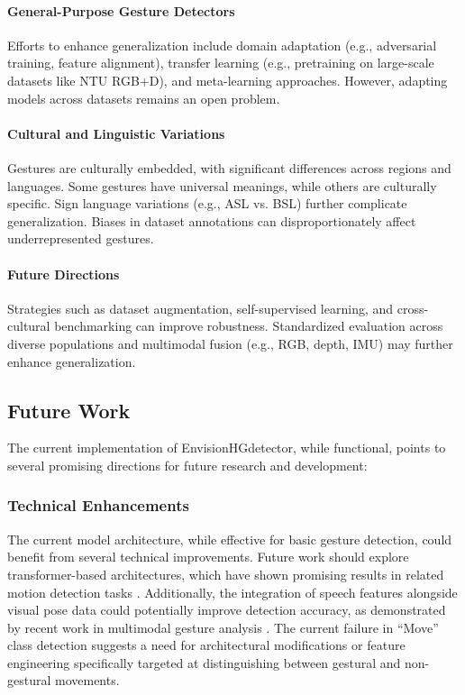 \paragraph{General-Purpose Gesture Detectors} Efforts to enhance generalization include domain adaptation (e.g., adversarial training, feature alignment), transfer learning (e.g., pretraining on large-scale datasets like NTU RGB+D), and meta-learning approaches. However, adapting models across datasets remains an open problem.

\paragraph{Cultural and Linguistic Variations} Gestures are culturally embedded, with significant differences across regions and languages. Some gestures have universal meanings, while others are culturally specific. Sign language variations (e.g., ASL vs. BSL) further complicate generalization. Biases in dataset annotations can disproportionately affect underrepresented gestures.

\paragraph{Future Directions} Strategies such as dataset augmentation, self-supervised learning, and cross-cultural benchmarking can improve robustness. Standardized evaluation across diverse populations and multimodal fusion (e.g., RGB, depth, IMU) may further enhance generalization.




\subsection{Future Work}

The current implementation of EnvisionHGdetector, while functional, points to several promising directions for future research and development:

\subsubsection{Technical Enhancements}
The current model architecture, while effective for basic gesture detection, could benefit from several technical improvements. Future work should explore transformer-based architectures, which have shown promising results in related motion detection tasks \citep{zhuMotionBERTUnifiedPerspective2023}. Additionally, the integration of speech features alongside visual pose data could potentially improve detection accuracy, as demonstrated by recent work in multimodal gesture analysis \citep{ghalebLeveragingSpeechGesture2024}. The current failure in ``Move'' class detection suggests a need for architectural modifications or feature engineering specifically targeted at distinguishing between gestural and non-gestural movements.

